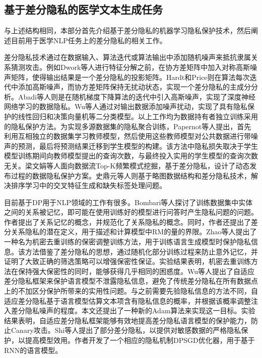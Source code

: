 \subsection{基于差分隐私的医学文本生成任务}

与上述结构相同，本部分首先介绍基于差分隐私的机器学习隐私保护技术，然后阐述目前用于医学NLP任务上的差分隐私的相关工作。

差分隐私技术通过在数据输入、算法迭代或算法输出中添加随机噪声来抵抗隶属关系猜测攻击。例如Dwork等人\cite{DP}进行特征分解之前，在协方差矩阵中加入对称高斯噪声矩阵，使得输出结果是一个差分隐私的投影矩阵。Hardt和Price\cite{hardt2014noisy}则在算法每次迭代中添加高斯噪声，而协方差矩阵保持无扰动状态，实现一个差分隐私的主成分分析。Abadi\cite{abadi2016deep}等人则是在随机梯度下降算法的迭代中引入高斯噪声，实现了深度神经网络学习的数据隐私。Wu等人\cite{wu2018training}通过对输出数据添加噪声扰动，实现了具有隐私保护的线性回归和决策向量机等二分类模型。以上工作均为数据持有者独立训练采用的隐私保护方法。为实现多源数据集的隐私聚合训练，Papernot\cite{papernot2016semi}等人提出，首先利用互相独立的数据集学习教师模型，然后使用这些教师模型对公共数据进行带噪声的预测，最后将预测结果迁移到学生模型的构建。该方法中隐私损失取决于学生模型训练期间向教师模型提出的查询次数，与最终投入实用的学生模型的查询次数无关。梁文娟等人面向数据流Top-K频繁模式挖掘，基于差分隐私，设计了动态发布过程的数据隐私保护方案。史鼎元\cite{CDFL}等人则基于略图数据结构和差分隐私技术，解决排序学习中的交叉特征生成和缺失标签处理问题。

目前基于DP用于NLP领域的工作有很多。Bombari等人\cite{bombari2022towards}探讨了训练数据集中实体之间的关系被记忆，即可能在使用训练好的模型进行问答时产生隐私问题的问题。作者提出了关系记忆的概念，并规范化了关系隐私的概念。同时，作者还提出了差分关系隐私的潜在定义，用于描述和计算模型中RM的量的界限。Zhao等人\cite{zhao2022provably}提出了一种名为机密去重训练的保密调整训练方法，用于训练语言生成模型时保护隐私信息。该方法借鉴了差分隐私的思想，通过随机化部分训练过程来防止意外记忆，并证明了大致正确的筛选策略可以增强保密性保证。实验结果表明，机密去重训练方法在保持强大保密性的同时，能够获得几乎相同的困惑度。Wu等人\cite{DPSSGD}提出了自适应差分隐私框架来保护语言模型不泄露隐私信息，避免了传统差分隐私在所有数据点上的不加区分保护所带来的实用性问题。与之前需要先验隐私信息的方法不同，自适应差分隐私基于语言模型估算文本项含有隐私信息的概率，并根据该概率调整注入差分隐私噪声的程度。本文还提出了一种新的Adam算法来实现这一目标。实验结果表明，自适应差分隐私框架能够有效地提高差分隐私语言模型的保护能力，防止Canary攻击。Shi等人\cite{selectivedp}提出了部分差分隐私，以提供对敏感数据的严格隐私保护，以提高模型效用。作者开发了一个相应的隐私机制DPSGD优化器，用于基于RNN的语言模型。

